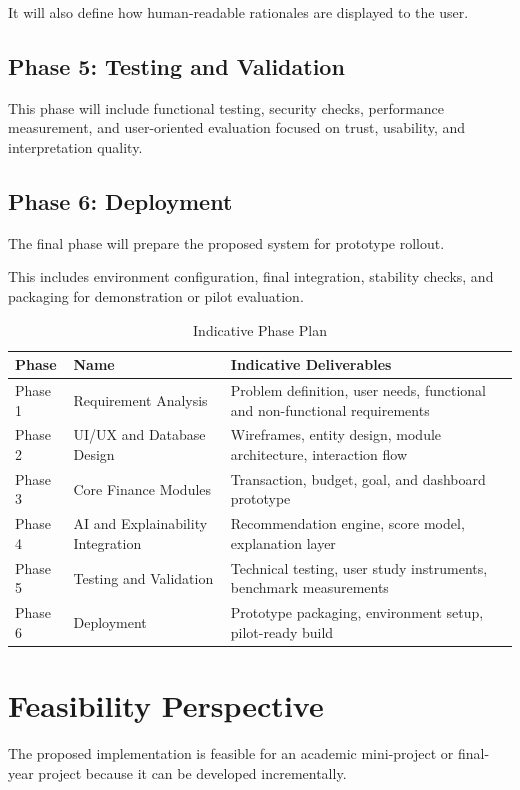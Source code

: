 \documentclass[12pt,a4paper]{report}
\begin{document}
It will also define how human-readable rationales are displayed to the user.

\subsection{Phase 5: Testing and Validation}
This phase will include functional testing,
security checks,
performance measurement,
and user-oriented evaluation focused on trust,
usability,
and interpretation quality.

\subsection{Phase 6: Deployment}
The final phase will prepare the proposed system for prototype rollout.

This includes environment configuration,
final integration,
stability checks,
and packaging for demonstration or pilot evaluation.

\begin{table}[H]
\centering
\caption{Indicative Phase Plan}
\label{tab:phases}
\begin{tabular}{p{2.2cm}p{4.3cm}p{7cm}}
\toprule
\textbf{Phase} & \textbf{Name} & \textbf{Indicative Deliverables} \\
\midrule
Phase 1 & Requirement Analysis & Problem definition,
user needs,
functional and non-functional requirements \\
Phase 2 & UI/UX and Database Design & Wireframes,
entity design,
module architecture,
interaction flow \\
Phase 3 & Core Finance Modules & Transaction,
budget,
goal,
and dashboard prototype \\
Phase 4 & AI and Explainability Integration & Recommendation engine,
score model,
explanation layer \\
Phase 5 & Testing and Validation & Technical testing,
user study instruments,
benchmark measurements \\
Phase 6 & Deployment & Prototype packaging,
environment setup,
pilot-ready build \\
\bottomrule
\end{tabular}
\end{table}

\section{Feasibility Perspective}
The proposed implementation is feasible for an academic mini-project or final-year project because it can be developed incrementally.
\end{document}
